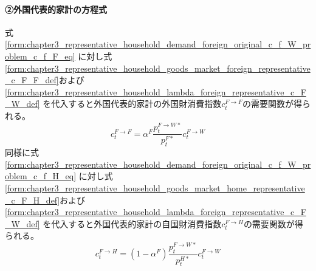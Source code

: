 \paragraph{②外国代表的家計の方程式}
\label{sec:chapter3_representative_household_demand_foreign_representative}
式
\eqref{form:chapter3_representative_household_demand_foreign_original_c_f_W_problem_c_f_F_eq}
に対し式
\eqref{form:chapter3_representative_household_goods_market_foreign_representative_c_F_F_def}および
\eqref{form:chapter3_representative_household_lambda_foreign_representative_c_F_W_def}
を代入すると外国代表的家計の外国財消費指数\(c_t^{F\to F}\)の需要関数が得られる。
\begin{equation}
\label{form:chapter3_representative_household_demand_foreign_representative_c_F_F_eq}
    c_t^{F\to F}=\alpha^F\frac{p_t^{F\to W*}}{p_t^{F*}}c_t^{F\to W}
\end{equation}
同様に式
\eqref{form:chapter3_representative_household_demand_foreign_original_c_f_W_problem_c_f_H_eq}
に対し式
\eqref{form:chapter3_representative_household_goods_market_home_representative_c_F_H_def}および
\eqref{form:chapter3_representative_household_lambda_foreign_representative_c_F_W_def}
を代入すると外国代表的家計の自国財消費指数\(c_t^{F\to H}\)の需要関数が得られる。
\begin{equation}
\label{form:chapter3_representative_household_demand_c_F_H}
    c_t^{F\to H}=(1-\alpha^F)\frac{p_t^{F\to W*}}{p_t^{H*}}c_t^{F\to W}
\end{equation}